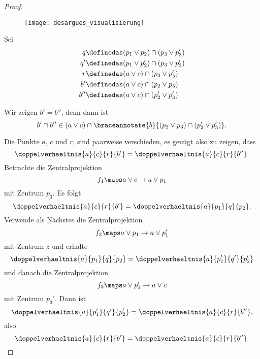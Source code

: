 \begin{proof}
  \begin{figure}
    \centering
    \texttt{[image: desargues\_visualisierung]}
    \label{fig:desargues_visualisierung}
  \end{figure}
  Sei
  \begin{align*}
    q&\definedas (p_1\vee p_2)\cap (p_3\vee p_3')\\
    q'&\definedas (p_1\vee p_2')\cap (p_3\vee p_3')\\
    r&\definedas (a\vee c)\cap (p_3\vee p_3')\\
    b'&\definedas (a\vee c) \cap (p_2\vee p_3)\\
    b''&\definedas (a\vee c)\cap (p_2'\vee p_3')
  \end{align*}
  
  \begin{ziel*}
    Wir zeigen \( b'=b'' \), denn dann ist
    \begin{equation*}
      b'\cap b''\in (a\vee c)\cap \braceannotate{b}{(p_2\vee p_3)\cap (p_2'\vee p_3')}.
    \end{equation*}
  \end{ziel*}
  Die Punkte \( a\), \( c \) und \( r \), sind paarweise verschieden, es genügt also zu zeigen, dass
  \begin{equation*}
    \doppelverhaeltnis{a}{c}{r}{b'}=\doppelverhaeltnis{a}{c}{r}{b''}.
  \end{equation*}
  Betrachte die Zentralprojektion
  \begin{equation*}
    f_1\maps a\vee c\to a\vee p_1
  \end{equation*}
  mit Zentrum \( p_3 \). Es folgt 
  \begin{equation*}
    \doppelverhaeltnis{a}{c}{r}{b'}=\doppelverhaeltnis{a}{p_1}{q}{p_2}.
  \end{equation*}
  Verwende als Nächstes die Zentralprojektion
  \begin{equation*}
    f_2\maps a\vee p_1\to  a\vee p_1'
  \end{equation*}
  mit Zentrum \( z \) und erhalte
  \begin{equation*}
    \doppelverhaeltnis{a}{p_1}{q}{p_2}=\doppelverhaeltnis{a}{p_1'}{q'}{p_2'}
  \end{equation*}
  und danach die Zentralprojektion
  \begin{equation*}
    f_3\maps a\vee p_1'\to a\vee c
  \end{equation*}
  mit Zentrum \( p_3' \). Dann ist
  \begin{equation*}
    \doppelverhaeltnis{a}{p_1'}{q'}{p_2'}=\doppelverhaeltnis{a}{c}{r}{b''},
  \end{equation*}
  also
  \begin{equation*}
    \doppelverhaeltnis{a}{c}{r}{b'}=\doppelverhaeltnis{a}{c}{r}{b''}.
  \end{equation*}
\end{proof}
